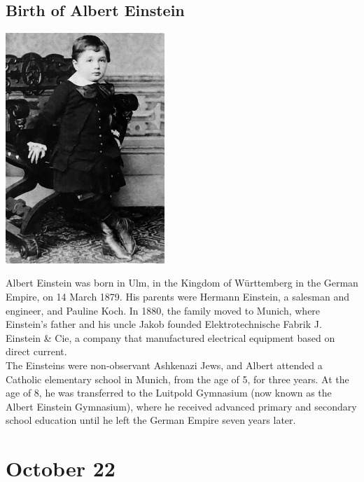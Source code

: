 \documentclass[11pt]{report}
\begin{document}
\subsection{Birth of Albert Einstein}
\vspace{2mm}\begin{center}\includegraphics[width=6cm]{./img/youngEinstein.jpg}\end{center}
Albert Einstein was born in Ulm, in the Kingdom of Württemberg in the German Empire, on 14 March 1879. His parents were Hermann Einstein, a salesman and engineer, and Pauline Koch. In 1880, the family moved to Munich, where Einstein's father and his uncle Jakob founded Elektrotechnische Fabrik J. Einstein \& Cie, a company that manufactured electrical equipment based on direct current.\\
The Einsteins were non-observant Ashkenazi Jews, and Albert attended a Catholic elementary school in Munich, from the age of 5, for three years. At the age of 8, he was transferred to the Luitpold Gymnasium (now known as the Albert Einstein Gymnasium), where he received advanced primary and secondary school education until he left the German Empire seven years later.
\section{October 22}
\end{document}

